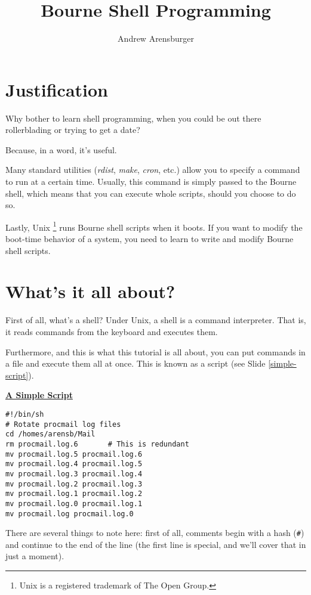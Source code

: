 \documentclass{article}
\title{Bourne Shell Programming}
\author{Andrew Arensburger}
\newcommand{\heading}[1]{%
  \begin{center}
    \large\textbf{\underline{#1}}
  \end{center}
  \vspace{1ex minus 1ex}}
\newcommand{\cmd}[1]{\textit{#1}}
\newcommand{\code}[1]{\texttt{#1}}
\newlength{\slidewidth}
\newenvironment{boxit}{%
  \begin{lrbox}{\savepar}
  \begin{minipage}[b]{\slidewidth}%
}{
  \end{minipage}
  \end{lrbox}
  \fbox{\usebox{\savepar}}
}
\newcommand{\slidecaption}{}
\newenvironment{slide}[1]{%
\renewcommand\figurename{Slide}
\renewcommand{\slidecaption}{#1}
\bigskip
\begin{boxit}
\heading{\slidecaption}
}{%
\end{boxit}
\bigskip
}
\begin{document}
\maketitle

\section{Justification}

	Why bother to learn shell programming, when you could be out
there rollerblading or trying to get a date?

	Because, in a word, it's useful.

	Many standard utilities (\cmd{rdist}, \cmd{make}, \cmd{cron},
etc.) allow you to specify a command to run at a certain
time. Usually, this command is simply passed to the Bourne shell,
which means that you can execute whole scripts, should you choose to
do so.

	Lastly, Unix%
\footnote{Unix is a registered trademark of The Open Group.}
runs Bourne shell scripts when it boots. If you
want to modify the boot-time behavior of a system, you need to learn
to write and modify Bourne shell scripts.

\section{What's it all about?}

	First of all, what's a shell? Under Unix, a shell is a command
interpreter. That is, it reads commands from the keyboard and executes
them.

	Furthermore, and this is what this tutorial is all about, you
can put commands in a file and execute them all at once. This is known
as a script (see Slide \ref{simple-script}).

\begin{slide}{A Simple Script}
\label{simple-script}

\begin{verbatim}
#!/bin/sh
# Rotate procmail log files
cd /homes/arensb/Mail
rm procmail.log.6       # This is redundant
mv procmail.log.5 procmail.log.6
mv procmail.log.4 procmail.log.5
mv procmail.log.3 procmail.log.4
mv procmail.log.2 procmail.log.3
mv procmail.log.1 procmail.log.2
mv procmail.log.0 procmail.log.1
mv procmail.log procmail.log.0
\end{verbatim}
\end{slide}

	There are several things to note here: first of all, comments
begin with a hash (\code{\#}) and continue to the end of the line (the
first line is special, and we'll cover that in just a moment).
\end{document}
